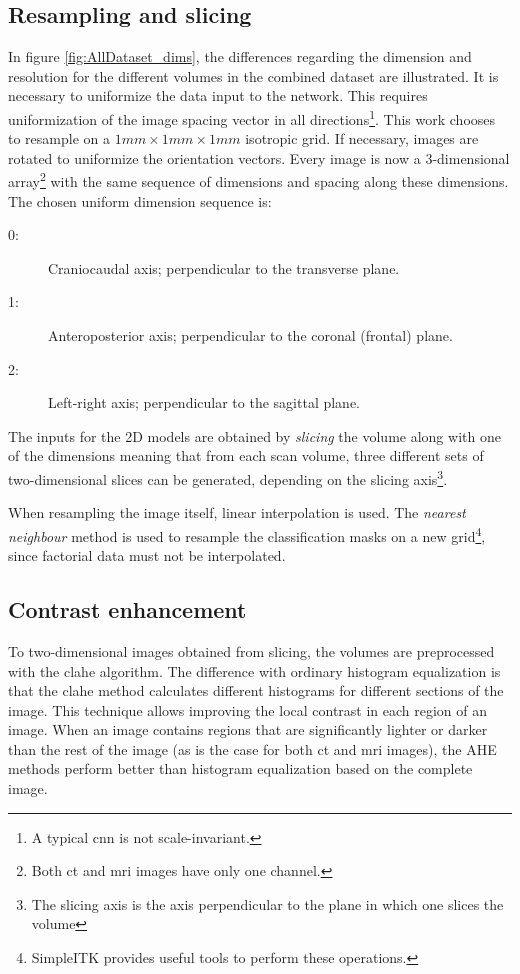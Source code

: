 \subsection{Resampling and slicing\label{sec:resampling}}
\par{
In figure \ref{fig:AllDataset_dims}, the differences regarding the dimension and resolution for the different volumes in the combined dataset are illustrated. 
It is necessary to uniformize the data input to the network. 
This requires uniformization of the image spacing vector in all directions\footnote{A typical \acrshort{cnn} is not scale-invariant.}. 
This work chooses to resample on a $1mm\times 1mm \times 1mm$ isotropic grid. 
If necessary, images are rotated to uniformize the orientation vectors. 
Every image is now a 3-dimensional array\footnote{Both \acrshort{ct} and \acrshort{mri} images have only one channel.} with the same sequence of dimensions and spacing along these dimensions.
The chosen uniform dimension sequence is:
\begin{description} 
    \item[0:] Craniocaudal axis; perpendicular to the transverse plane.
    \item[1:] Anteroposterior axis; perpendicular to the coronal (frontal) plane.
    \item[2:] Left-right axis; perpendicular to the sagittal plane.
\end{description}
The inputs for the 2D models are obtained by \textit{slicing} the volume along with one of the dimensions meaning that from each scan volume, three different sets of two-dimensional slices can be generated, depending on the slicing axis\footnote{The slicing axis is the axis perpendicular to the plane in which one slices the volume}.
}
\par{
When resampling the image itself, linear interpolation is used. 
The \textit{nearest neighbour} method is used to resample the classification masks on a new grid\footnote{
    SimpleITK \cite{sitk} provides useful tools to perform these operations.
    },
since factorial data must not be interpolated. 
}


\subsection{Contrast enhancement}
\par{
To two-dimensional images obtained from slicing, the volumes are preprocessed with the \acrfull{clahe} algorithm. 
The difference with ordinary histogram equalization is that the \acrshort{clahe} method calculates different histograms for different sections of the image.
This technique allows improving the local contrast in each region of an image.
When an image contains regions that are significantly lighter or darker than the rest of the image (as is the case for both \acrshort{ct} and \acrshort{mri} images), the AHE methods perform better than histogram equalization based on the complete image.

}


